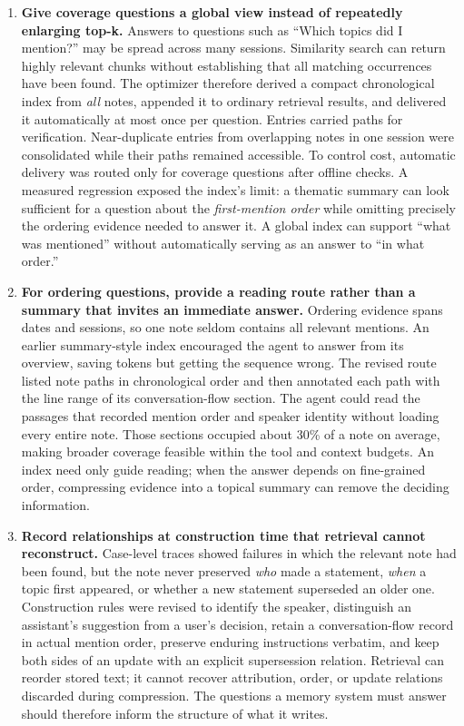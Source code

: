 \begin{enumerate}
\item \textbf{Give coverage questions a global view instead of repeatedly enlarging top-k.} Answers to questions such as ``Which topics did I mention?'' may be spread across many sessions. Similarity search can return highly relevant chunks without establishing that all matching occurrences have been found. The optimizer therefore derived a compact chronological index from \emph{all} notes, appended it to ordinary retrieval results, and delivered it automatically at most once per question. Entries carried paths for verification. Near-duplicate entries from overlapping notes in one session were consolidated while their paths remained accessible. To control cost, automatic delivery was routed only for coverage questions after offline checks. A measured regression exposed the index's limit: a thematic summary can look sufficient for a question about the \emph{first-mention order} while omitting precisely the ordering evidence needed to answer it. A global index can support ``what was mentioned'' without automatically serving as an answer to ``in what order.''

\item \textbf{For ordering questions, provide a reading route rather than a summary that invites an immediate answer.} Ordering evidence spans dates and sessions, so one note seldom contains all relevant mentions. An earlier summary-style index encouraged the agent to answer from its overview, saving tokens but getting the sequence wrong. The revised route listed note paths in chronological order and then annotated each path with the line range of its conversation-flow section. The agent could read the passages that recorded mention order and speaker identity without loading every entire note. Those sections occupied about 30\% of a note on average, making broader coverage feasible within the tool and context budgets. An index need only guide reading; when the answer depends on fine-grained order, compressing evidence into a topical summary can remove the deciding information.

\item \textbf{Record relationships at construction time that retrieval cannot reconstruct.} Case-level traces showed failures in which the relevant note had been found, but the note never preserved \emph{who} made a statement, \emph{when} a topic first appeared, or whether a new statement superseded an older one. Construction rules were revised to identify the speaker, distinguish an assistant's suggestion from a user's decision, retain a conversation-flow record in actual mention order, preserve enduring instructions verbatim, and keep both sides of an update with an explicit supersession relation. Retrieval can reorder stored text; it cannot recover attribution, order, or update relations discarded during compression. The questions a memory system must answer should therefore inform the structure of what it writes.

\end{enumerate}

